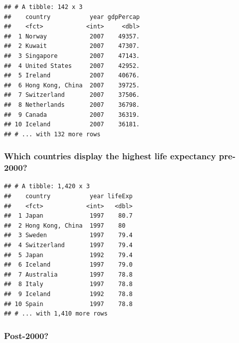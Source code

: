 \documentclass[11pt,]{article}
\newenvironment{Shaded}{\begin{snugshade}}{\end{snugshade}}
\newcommand{\KeywordTok}[1]{\textcolor[rgb]{0.13,0.29,0.53}{\textbf{#1}}}
\newcommand{\DecValTok}[1]{\textcolor[rgb]{0.00,0.00,0.81}{#1}}
\newcommand{\StringTok}[1]{\textcolor[rgb]{0.31,0.60,0.02}{#1}}
\newcommand{\OperatorTok}[1]{\textcolor[rgb]{0.81,0.36,0.00}{\textbf{#1}}}
\newcommand{\NormalTok}[1]{#1}
\begin{document}
\begin{verbatim}
## # A tibble: 142 x 3
##    country           year gdpPercap
##    <fct>            <int>     <dbl>
##  1 Norway            2007    49357.
##  2 Kuwait            2007    47307.
##  3 Singapore         2007    47143.
##  4 United States     2007    42952.
##  5 Ireland           2007    40676.
##  6 Hong Kong, China  2007    39725.
##  7 Switzerland       2007    37506.
##  8 Netherlands       2007    36798.
##  9 Canada            2007    36319.
## 10 Iceland           2007    36181.
## # ... with 132 more rows
\end{verbatim}

\subsubsection{Which countries display the highest life expectancy
pre-2000?}\label{which-countries-display-the-highest-life-expectancy-pre-2000}

\begin{Shaded}
\end{Shaded}

\begin{verbatim}
## # A tibble: 1,420 x 3
##    country           year lifeExp
##    <fct>            <int>   <dbl>
##  1 Japan             1997    80.7
##  2 Hong Kong, China  1997    80  
##  3 Sweden            1997    79.4
##  4 Switzerland       1997    79.4
##  5 Japan             1992    79.4
##  6 Iceland           1997    79.0
##  7 Australia         1997    78.8
##  8 Italy             1997    78.8
##  9 Iceland           1992    78.8
## 10 Spain             1997    78.8
## # ... with 1,410 more rows
\end{verbatim}

\subsubsection{Post-2000?}\label{post-2000}
\end{document}
